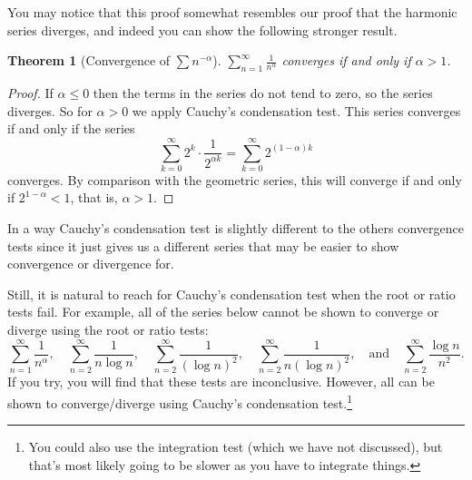 \documentclass[11pt, a4paper]{article}
\newtheorem{theorem}{Theorem}[section]
\theoremstyle{definition}
\newenvironment{aside}[1]{
	\noindent
    \rule{\textwidth}{0.025cm}
    \vspace{-1.75\baselineskip}
    \subsection*{#1}}
{\noindent\rule{\textwidth}{0.025cm}}
\begin{document}
You may notice that this proof somewhat resembles our proof that the harmonic series diverges, and indeed you can show the following stronger result.

\begin{theorem}[Convergence of $\sum n^{-\alpha}$]
	$\sum_{n = 1}^{\infty} \frac{1}{n^\alpha}$ converges if and only if $\alpha > 1$.
\end{theorem}
\begin{proof}
If $\alpha \leq 0$ then the terms in the series do not tend to zero, so the series diverges. So for $\alpha > 0$ we apply Cauchy's condensation test. This series converges if and only if the series
$$
\sum_{k = 0}^{\infty} 2^k \cdot \frac{1}{2^{\alpha k}} = \sum_{k = 0}^{\infty} 2^{(1 - \alpha) k}
$$
converges. By comparison with the geometric series, this will converge if and only if $2^{1 - \alpha} < 1$, that is, $\alpha > 1$.
\end{proof}


In a way Cauchy's condensation test is slightly different to the others convergence tests since it just gives us a different series that may be easier to show convergence or divergence for.

Still, it is natural to reach for Cauchy's condensation test when the root or ratio tests fail. For example, all of the series below cannot be shown to converge or diverge using the root or ratio tests:
$$
\sum_{n=1}^{\infty} \frac{1}{n^{\alpha}}, \quad \sum_{n=2}^{\infty} \frac{1}{n \log n}, \quad \sum_{n=2}^{\infty} \frac{1}{(\log n)^{2}}, \quad \sum_{n=2}^{\infty} \frac{1}{n(\log n)^{2}}, \quad \text{and} \quad \sum_{n=2}^{\infty} \frac{\log n}{n^{2}}.
$$
If you try, you will find that these tests are inconclusive. However, all can be shown to converge/diverge using Cauchy's condensation test.\footnote{You could also use the integration test (which we have not discussed), but that's most likely going to be slower as you have to integrate things.}





	
\end{document}

